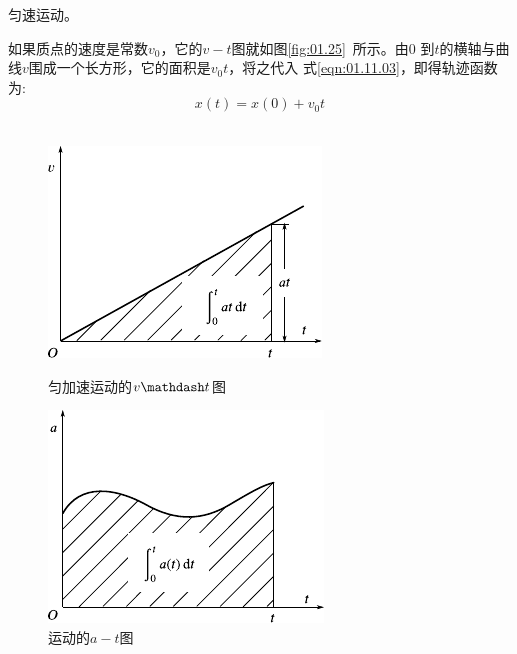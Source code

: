 \example 匀速运动。

如果质点的速度是常数$v_0$，它的$v-t$图就如图\ref{fig:01.25}~所示。由0
到$t$的横轴与曲线$v$围成一个长方形，它的面积是$v_0t$，将之代入
式\eqref{eqn:01.11.03}，即得轨迹函数为:
\begin{equation}\label{eqn:01.11.04}
  x\left(t\right)=x\left(0\right)+v_0 t
\end{equation}
~\vspace{-1.5em}
\begin{figure}[!h]
  \begin{minipage}[b]{14em}
    \centering
    \includegraphics[width=0.8\linewidth]{figure/fig01.26}
    \caption{匀加速运动的$v \mathdash t$图}
    \label{fig:01.26}
  \end{minipage}\hfill
  \begin{minipage}[b]{14em}
    \centering
    \includegraphics[width=0.8\linewidth]{figure/fig01.27}
    \caption{运动的$a-t$图}
    \label{fig:01.27}
  \end{minipage}
\end{figure}

